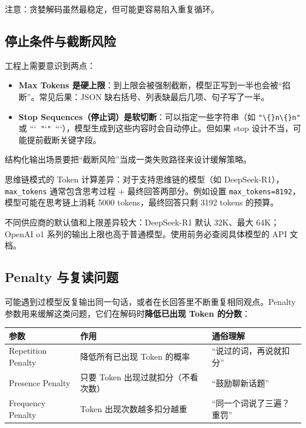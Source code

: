 \documentclass[10pt,a4paper]{ctexart}
\begin{document}
注意：贪婪解码虽然最稳定，但可能更容易陷入重复循环。



\subsection{停止条件与截断风险}


工程上需要意识到两点：


\begin{itemize}[itemsep=2pt, topsep=4pt]
  \item \textbf{Max Tokens 是硬上限}：到上限会被强制截断，模型正写到一半也会被“掐断”。常见后果：JSON 缺右括号、列表缺最后几项、句子写了一半。
  \item \textbf{Stop Sequences（停止词）是软切断}：可以指定一些字符串（如 \texttt{"\textbackslash\{\}n\textbackslash\{\}n"} 或 ```\texttt{ "}`\texttt{" }```），模型生成到这些内容时会自动停止。但如果 stop 设计不当，可能提前截断关键字段。
\end{itemize}


结构化输出场景要把“截断风险”当成一类失败路径来设计缓解策略。



思维链模式的 Token 计算差异：对于支持思维链的模型（如 DeepSeek-R1），\texttt{max\_tokens} 通常包含思考过程 + 最终回答两部分。例如设置 \texttt{max\_tokens=8192}，模型可能在思考链上消耗 5000 tokens，最终回答只剩 3192 tokens 的预算。



不同供应商的默认值和上限差异较大：DeepSeek-R1 默认 32K、最大 64K；OpenAI o1 系列的输出上限也高于普通模型。使用前务必查阅具体模型的 API 文档。



\subsection{Penalty 与复读问题}


可能遇到过模型反复输出同一句话，或者在长回答里不断重复相同观点。Penalty 参数用来缓解这类问题，它们在解码时\textbf{降低已出现 Token 的分数}：


{\footnotesize
\begin{tabularx}{\textwidth}{|X|X|X|}
\hline
\textbf{参数} & \textbf{作用} & \textbf{通俗理解} \\
\hline
Repetition Penalty & 降低所有已出现 Token 的概率 & “说过的词，再说就扣分” \\
\hline
Presence Penalty & 只要 Token 出现过就扣分（不看次数） & “鼓励聊新话题” \\
\hline
Frequency Penalty & Token 出现次数越多扣分越重 & “同一个词说了三遍？重罚” \\
\hline
\end{tabularx}
}
\end{document}
